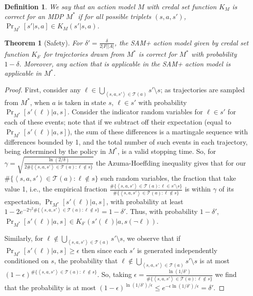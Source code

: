 \documentclass[letterpaper]{article} %
\newtheorem{theorem}{Theorem}
\newtheorem{definition}{Definition}
\newcommand{\tuple}[1]{\ensuremath{\left \langle #1 \right \rangle }}
\begin{document}
\begin{definition}
We say that an action model $M$ with credal set function $K_M$ is \emph{correct} for an MDP $M^*$ if for all possible triplets $(s,a,s')$, $\Pr_{M^*}[s'|s,a]\in K_M(s'|s,a)$.
\end{definition}


\begin{theorem}[Safety]\label{thm:sam-safe}
For $\delta'=\frac{\delta}{2|F||A|}$, the SAM+ action model given by credal set function $K_{\delta'}$ for trajectories drawn from $M^*$ is correct for $M^*$ with probability $1-\delta$. Moreover, any action that is applicable in the SAM+ action model is applicable in $M^*$.
\end{theorem}
\begin{proof}
First, consider any $\ell\in\bigcup_{\tuple{s, a, s'}\in \mathcal{T}(a)} s'\setminus s $; as trajectories are sampled from $M^*$, when $a$ is taken in state $s$, $\ell\in s'$ with probability $\Pr_{M^*}[s'(\ell)|a,s]$. Consider the indicator random variables for $\ell\in s'$ for each of these events; note that if we subtract off their expectation (equal to $\Pr_{M^*}[s'(\ell)|a,s]$), the sum of these differences is a martingale sequence with differences bounded by 1, and the total number of such events in each trajectory, being determined by the policy in $M^*$, is a valid stopping time. So, for 
$
\gamma = \sqrt{\frac{\ln(2/\delta)}{2\#\{\tuple{s, a, s'}\in \mathcal{T}(a):\ell\notin s\}}}
$
the Azuma-Hoeffding inequality gives that for our $\#\{\tuple{s, a, s'}\in \mathcal{T}(a):\ell\notin s\}$ such random variables, the fraction that take value 1, i.e., the empirical fraction
$
\frac{\#\{\tuple{s, a, s'}\in \mathcal{T}(a):\ell\in s'\setminus s\}}{\#\{\tuple{s, a, s'}\in \mathcal{T}(a):\ell \notin s\}}
$
is within $\gamma$ of its expectation, $\Pr_{M^*}[s'(\ell)|a,s]$, with probability at least $1-2e^{-2\gamma^2\#\{\tuple{s, a, s'}\in \mathcal{T}(a):\ell \notin s\}}=1-\delta'$. Thus, with probability $1-\delta'$, $\Pr_{M^*}[s'(\ell)|a,s]\in K_{\delta'}(s'(\ell)|a,s(\neg\ell))$. 

Similarly, for $\ell\notin\bigcup_{\tuple{s, a, s'}\in \mathcal{T}(a)} s'\setminus s$, we observe that if 
$\Pr_{M^*}[s'(\ell)|a,s]\geq \epsilon$
then since each $s'$ is generated independently conditioned on $s$, the probability that $\ell\notin\bigcup_{\tuple{s, a, s'}\in \mathcal{T}(a)} s'\setminus s$ is at most
$
(1-\epsilon)^{\#\{\tuple{s, a, s'}\in \mathcal{T}(a):\ell\notin s\}}.
$
So, taking
$
\epsilon = \frac{\ln(1/\delta')}{\#\{\tuple{s, a, s'}\in \mathcal{T}(a):\ell\notin s\}}
$
we find that the probability is at most
$
(1-\epsilon)^{\ln(1/\delta')/\epsilon}
\leq e^{-\epsilon \ln(1/\delta')/\epsilon}
=\delta'.
$


\end{proof}
\end{document}
